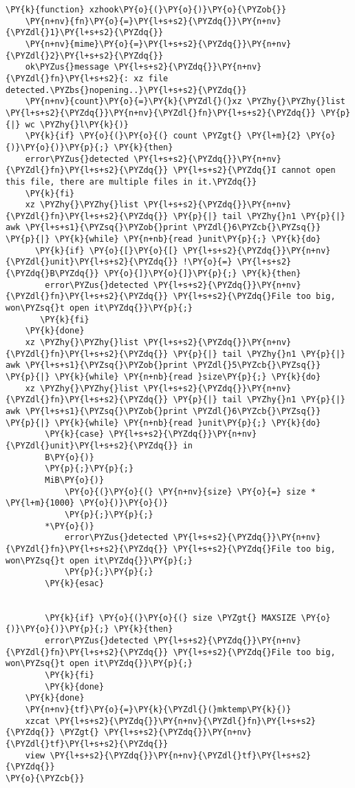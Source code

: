 \begin{Verbatim}[commandchars=\\\{\}]
\PY{k}{function} xzhook\PY{o}{(}\PY{o}{)}\PY{o}{\PYZob{}}
    \PY{n+nv}{fn}\PY{o}{=}\PY{l+s+s2}{\PYZdq{}}\PY{n+nv}{\PYZdl{}1}\PY{l+s+s2}{\PYZdq{}}
    \PY{n+nv}{mime}\PY{o}{=}\PY{l+s+s2}{\PYZdq{}}\PY{n+nv}{\PYZdl{}2}\PY{l+s+s2}{\PYZdq{}}
    ok\PYZus{}message \PY{l+s+s2}{\PYZdq{}}\PY{n+nv}{\PYZdl{}fn}\PY{l+s+s2}{: xz file detected.\PYZbs{}nopening..}\PY{l+s+s2}{\PYZdq{}}
    \PY{n+nv}{count}\PY{o}{=}\PY{k}{\PYZdl{}(}xz \PYZhy{}\PYZhy{}list \PY{l+s+s2}{\PYZdq{}}\PY{n+nv}{\PYZdl{}fn}\PY{l+s+s2}{\PYZdq{}} \PY{p}{|} wc \PYZhy{}l\PY{k}{)}
    \PY{k}{if} \PY{o}{(}\PY{o}{(} count \PYZgt{} \PY{l+m}{2} \PY{o}{)}\PY{o}{)}\PY{p}{;} \PY{k}{then}
	error\PYZus{}detected \PY{l+s+s2}{\PYZdq{}}\PY{n+nv}{\PYZdl{}fn}\PY{l+s+s2}{\PYZdq{}} \PY{l+s+s2}{\PYZdq{}I cannot open this file, there are multiple files in it.\PYZdq{}}
    \PY{k}{fi}
    xz \PYZhy{}\PYZhy{}list \PY{l+s+s2}{\PYZdq{}}\PY{n+nv}{\PYZdl{}fn}\PY{l+s+s2}{\PYZdq{}} \PY{p}{|} tail \PYZhy{}n1 \PY{p}{|} awk \PY{l+s+s1}{\PYZsq{}\PYZob{}print \PYZdl{}6\PYZcb{}\PYZsq{}} \PY{p}{|} \PY{k}{while} \PY{n+nb}{read }unit\PY{p}{;} \PY{k}{do}
	  \PY{k}{if} \PY{o}{[}\PY{o}{[} \PY{l+s+s2}{\PYZdq{}}\PY{n+nv}{\PYZdl{}unit}\PY{l+s+s2}{\PYZdq{}} !\PY{o}{=} \PY{l+s+s2}{\PYZdq{}B\PYZdq{}} \PY{o}{]}\PY{o}{]}\PY{p}{;} \PY{k}{then}
		error\PYZus{}detected \PY{l+s+s2}{\PYZdq{}}\PY{n+nv}{\PYZdl{}fn}\PY{l+s+s2}{\PYZdq{}} \PY{l+s+s2}{\PYZdq{}File too big, won\PYZsq{}t open it\PYZdq{}}\PY{p}{;}
	   \PY{k}{fi}
    \PY{k}{done}
    xz \PYZhy{}\PYZhy{}list \PY{l+s+s2}{\PYZdq{}}\PY{n+nv}{\PYZdl{}fn}\PY{l+s+s2}{\PYZdq{}} \PY{p}{|} tail \PYZhy{}n1 \PY{p}{|} awk \PY{l+s+s1}{\PYZsq{}\PYZob{}print \PYZdl{}5\PYZcb{}\PYZsq{}} \PY{p}{|} \PY{k}{while} \PY{n+nb}{read }size\PY{p}{;} \PY{k}{do}
	xz \PYZhy{}\PYZhy{}list \PY{l+s+s2}{\PYZdq{}}\PY{n+nv}{\PYZdl{}fn}\PY{l+s+s2}{\PYZdq{}} \PY{p}{|} tail \PYZhy{}n1 \PY{p}{|} awk \PY{l+s+s1}{\PYZsq{}\PYZob{}print \PYZdl{}6\PYZcb{}\PYZsq{}} \PY{p}{|} \PY{k}{while} \PY{n+nb}{read }unit\PY{p}{;} \PY{k}{do}
	    \PY{k}{case} \PY{l+s+s2}{\PYZdq{}}\PY{n+nv}{\PYZdl{}unit}\PY{l+s+s2}{\PYZdq{}} in
		B\PY{o}{)}
		\PY{p}{;}\PY{p}{;}
		MiB\PY{o}{)}
		    \PY{o}{(}\PY{o}{(} \PY{n+nv}{size} \PY{o}{=} size * \PY{l+m}{1000} \PY{o}{)}\PY{o}{)}
		    \PY{p}{;}\PY{p}{;}
		*\PY{o}{)}
		    error\PYZus{}detected \PY{l+s+s2}{\PYZdq{}}\PY{n+nv}{\PYZdl{}fn}\PY{l+s+s2}{\PYZdq{}} \PY{l+s+s2}{\PYZdq{}File too big, won\PYZsq{}t open it\PYZdq{}}\PY{p}{;}
		    \PY{p}{;}\PY{p}{;}
		\PY{k}{esac}


	    \PY{k}{if} \PY{o}{(}\PY{o}{(} size \PYZgt{} MAXSIZE \PY{o}{)}\PY{o}{)}\PY{p}{;} \PY{k}{then}
		error\PYZus{}detected \PY{l+s+s2}{\PYZdq{}}\PY{n+nv}{\PYZdl{}fn}\PY{l+s+s2}{\PYZdq{}} \PY{l+s+s2}{\PYZdq{}File too big, won\PYZsq{}t open it\PYZdq{}}\PY{p}{;}
	    \PY{k}{fi}
	    \PY{k}{done}
    \PY{k}{done}
    \PY{n+nv}{tf}\PY{o}{=}\PY{k}{\PYZdl{}(}mktemp\PY{k}{)}
    xzcat \PY{l+s+s2}{\PYZdq{}}\PY{n+nv}{\PYZdl{}fn}\PY{l+s+s2}{\PYZdq{}} \PYZgt{} \PY{l+s+s2}{\PYZdq{}}\PY{n+nv}{\PYZdl{}tf}\PY{l+s+s2}{\PYZdq{}}
    view \PY{l+s+s2}{\PYZdq{}}\PY{n+nv}{\PYZdl{}tf}\PY{l+s+s2}{\PYZdq{}}
\PY{o}{\PYZcb{}}


\end{Verbatim}
